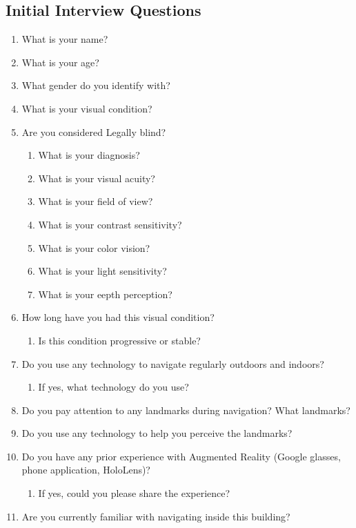 \subsection{Initial Interview Questions}
\begin{enumerate}
    \item What is your name?
    \item What is your age?
    \item What gender do you identify with?
    \item What is your visual condition?
    \item Are you considered Legally blind?
\begin{enumerate}
    \item What is your diagnosis? 
    \item What is your visual acuity?
    \item What is your field of view?
    \item What is your contrast sensitivity?
    \item What is your color vision?
    \item What is your light sensitivity? 
    \item What is your eepth perception? 
\end{enumerate}
    \item How long have you had this visual condition?
\begin{enumerate}
    \item Is this condition progressive or stable?
\end{enumerate}
    \item Do you use any technology to navigate regularly outdoors and indoors?
\begin{enumerate}
    \item If yes, what technology do you use?
\end{enumerate}
    \item Do you pay attention to any landmarks during navigation? What landmarks?
    \item Do you use any technology to help you perceive the landmarks?
    \item Do you have any prior experience with Augmented Reality (Google glasses, phone application, HoloLens)? 
\begin{enumerate}
    \item If yes, could you please share the experience?
\end{enumerate}
    \item Are you currently familiar with navigating inside this building?
\end{enumerate}



